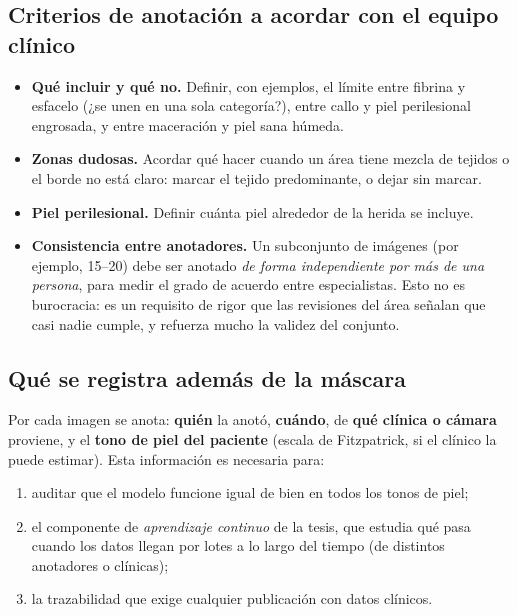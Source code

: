 \documentclass[12pt,letterpaper]{article}
\begin{document}
\subsection{Criterios de anotación a acordar con el equipo clínico}

\begin{itemize}
  \item \textbf{Qué incluir y qué no.} Definir, con ejemplos, el límite entre fibrina y esfacelo
        (¿se unen en una sola categoría?), entre callo y piel perilesional engrosada, y entre
        maceración y piel sana húmeda.
  \item \textbf{Zonas dudosas.} Acordar qué hacer cuando un área tiene mezcla de tejidos o el borde
        no está claro: marcar el tejido predominante, o dejar sin marcar.
  \item \textbf{Piel perilesional.} Definir cuánta piel alrededor de la herida se incluye.
  \item \textbf{Consistencia entre anotadores.} Un subconjunto de imágenes (por ejemplo, 15--20)
        debe ser anotado \emph{de forma independiente por más de una persona}, para medir el grado de
        acuerdo entre especialistas. Esto no es burocracia: es un requisito de rigor que las
        revisiones del área señalan que casi nadie cumple, y refuerza mucho la validez del conjunto.
\end{itemize}

\subsection{Qué se registra además de la máscara}

Por cada imagen se anota: \textbf{quién} la anotó, \textbf{cuándo}, de \textbf{qué clínica o
cámara} proviene, y el \textbf{tono de piel del paciente} (escala de Fitzpatrick, si el clínico la
puede estimar). Esta información es necesaria para:

\begin{enumerate}
  \item auditar que el modelo funcione igual de bien en todos los tonos de piel;
  \item el componente de \emph{aprendizaje continuo} de la tesis, que estudia qué pasa cuando los
        datos llegan por lotes a lo largo del tiempo (de distintos anotadores o clínicas);
  \item la trazabilidad que exige cualquier publicación con datos clínicos.
\end{enumerate}
\end{document}
